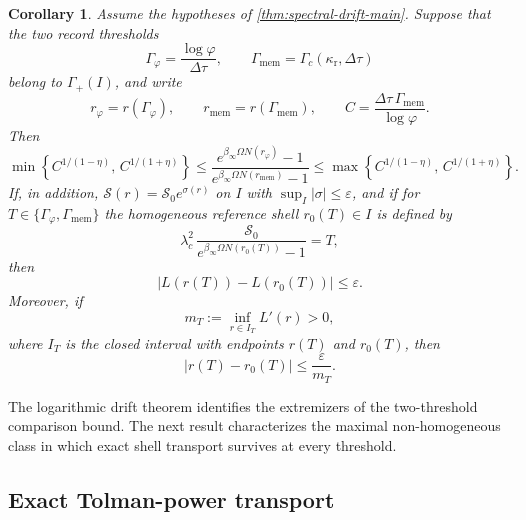 \documentclass[11pt]{article}
\newtheorem{corollary}[theorem]{Corollary}
\theoremstyle{definition}
\begin{document}
\begin{corollary}\label{cor:greybody-control-main}
Assume the hypotheses of \cref{thm:spectral-drift-main}. Suppose that the two record thresholds
\[
\Gamma_\varphi=\frac{\log\varphi}{\Delta\tau},
\qquad
\Gamma_{\mathrm{mem}}=\Gamma_c(\kappa_{\mathrm r},\Delta\tau)
\]
belong to $\Gamma_+(I)$, and write
\[
r_\varphi=r(\Gamma_\varphi),
\qquad
r_{\mathrm{mem}}=r(\Gamma_{\mathrm{mem}}),
\qquad
C=\frac{\Delta\tau\,\Gamma_{\mathrm{mem}}}{\log\varphi}.
\]
Then
\begin{equation}\label{eq:greybody-ratio-band-main}
\min\!\left\{C^{1/(1-\eta)},\,C^{1/(1+\eta)}\right\}
\le
\frac{e^{\beta_\infty\Omega N(r_\varphi)}-1}
     {e^{\beta_\infty\Omega N(r_{\mathrm{mem}})}-1}
\le
\max\!\left\{C^{1/(1-\eta)},\,C^{1/(1+\eta)}\right\}.
\end{equation}
If, in addition, $\mathcal S(r)=\mathcal S_0e^{\sigma(r)}$ on $I$ with $\sup_I|\sigma|\le\varepsilon$, and if for $T\in\{\Gamma_\varphi,\Gamma_{\mathrm{mem}}\}$ the homogeneous reference shell $r_0(T)\in I$ is defined by
\[
\lambda_c^2\,
\frac{\mathcal S_0}{e^{\beta_\infty\Omega N(r_0(T))}-1}
=
T,
\]
then
\begin{equation}\label{eq:greybody-log-displacement-main}
\left|L(r(T))-L(r_0(T))\right|\le\varepsilon.
\end{equation}
Moreover, if
\[
m_T:=\inf_{r\in I_T}L'(r)>0,
\]
where $I_T$ is the closed interval with endpoints $r(T)$ and $r_0(T)$, then
\begin{equation}\label{eq:greybody-radius-displacement-main}
\left|r(T)-r_0(T)\right|\le\frac{\varepsilon}{m_T}.
\end{equation}
\end{corollary}

The logarithmic drift theorem identifies the extremizers of the two-threshold comparison bound. The next result characterizes the maximal non-homogeneous class in which exact shell transport survives at every threshold.

\subsection{Exact Tolman-power transport}
\end{document}

